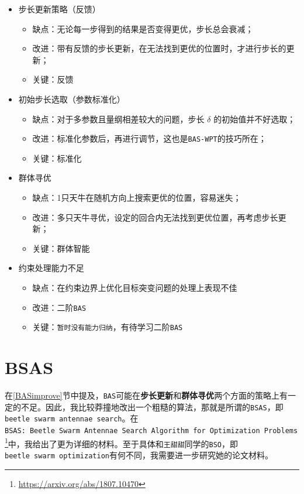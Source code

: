 \documentclass[]{ctexbook}
\providecommand{\tightlist}{%
  \setlength{\itemsep}{0pt}\setlength{\parskip}{0pt}}
\renewcommand{\href}[2]{#2\footnote{\url{#1}}}
\theoremstyle{definition}
\theoremstyle{definition}
\theoremstyle{definition}
\theoremstyle{remark}
\begin{document}
\begin{itemize}
\tightlist
\item
  步长更新策略（反馈）

  \begin{itemize}
  \tightlist
  \item
    缺点：无论每一步得到的结果是否变得更优，步长总会衰减；
  \item
    改进：带有反馈的步长更新，在无法找到更优的位置时，才进行步长的更新；
  \item
    关键：反馈
  \end{itemize}
\item
  初始步长选取（参数标准化）

  \begin{itemize}
  \tightlist
  \item
    缺点：对于多参数且量纲相差较大的问题，步长 \(\delta\)
    的初始值并不好选取；
  \item
    改进：标准化参数后，再进行调节，这也是\texttt{BAS-WPT}的技巧所在；
  \item
    关键：标准化
  \end{itemize}
\item
  群体寻优

  \begin{itemize}
  \tightlist
  \item
    缺点：1只天牛在随机方向上搜索更优的位置，容易迷失；
  \item
    改进：多只天牛寻优，设定的回合内无法找到更优位置，再考虑步长更新；
  \item
    关键：群体智能
  \end{itemize}
\item
  约束处理能力不足

  \begin{itemize}
  \tightlist
  \item
    缺点：在约束边界上优化目标突变问题的处理上表现不佳
  \item
    改进：二阶\texttt{BAS}
  \item
    关键：\texttt{暂时没有能力归纳}，有待学习二阶\texttt{BAS}
  \end{itemize}
\end{itemize}

\section{BSAS}\label{bsas}

在\ref{BASimprove}节中提及，\texttt{BAS}可能在\textbf{步长更新}和\textbf{群体寻优}两个方面的策略上有一定的不足。因此，我比较莽撞地改出一个粗糙的算法，那就是所谓的\texttt{BSAS}，即\texttt{beetle\ swarm\ antennae\ search}。在\href{https://arxiv.org/abs/1807.10470}{\texttt{BSAS:\ Beetle\ Swarm\ Antennae\ Search\ Algorithm\ for\ Optimization\ Problems}}中，我给出了更为详细的材料。至于具体和\texttt{王甜甜}同学的\texttt{BSO}，即\texttt{beetle\ swarm\ optimization}有何不同，我需要进一步研究她的论文材料。
\end{document}

